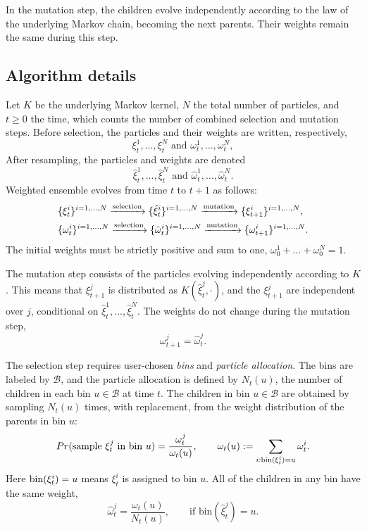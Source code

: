 \documentclass[11pt,letterpaper]{amsart}
\theoremstyle{plain}
\theoremstyle{definition}
\numberwithin{equation}{section}
\begin{document}
In the mutation step, the 
children evolve independently 
according to the law of the 
underlying Markov chain, becoming 
the next parents.
Their weights remain 
the same during this step.

\subsection{Algorithm details}

Let $K$ be the underlying Markov kernel, 
$N$ the total number of particles, 
and $t \ge 0$ the time, 
which counts the number of combined selection 
and mutation steps. Before selection, the particles 
and their weights are written, respectively,
$$\xi_t^1,\ldots,\xi_t^N \text{ and } 
\omega_t^1,\ldots,\omega_t^N,$$
After resampling, the particles 
and weights are denoted
$$\hat\xi_t^1,\ldots,\hat\xi_t^N\text{ and } 
\hat\omega_t^1,\ldots,\hat\omega_t^N.$$
Weighted ensemble evolves from 
time $t$ to $t+1$ as follows:
\begin{align*}
&\{\xi_t^i\}^{i=1,\ldots,N}
\xrightarrow{\textup{selection}} 
\{{\hat \xi}_t^i\}^{i=1,\ldots,N}
\xrightarrow{\textup{mutation}} 
\{{\xi}_{t+1}^i\}^{i=1,\ldots,N},\\
&\{\omega_t^i\}^{i=1,\ldots,N}
\xrightarrow{\textup{selection}} 
\{{\hat \omega}_t^i\}^{i=1,\ldots,{N}}
\xrightarrow{\textup{mutation}} 
\{{\omega}_{t+1}^i\}^{i=1,\ldots,N}.
\end{align*}
The initial weights must be strictly positive and sum to one, 
$\omega_0^1+\ldots+\omega_0^N = 1$.

The mutation step consists 
of the particles evolving independently
according to  
$K$.
This means that $\xi_{t+1}^j$ is 
distributed as $K({\hat \xi}_t^j,\cdot)$, 
and the $\xi_{t+1}^j$ are independent over 
$j$, conditional on $\hat{\xi}_t^1,\ldots,\hat{\xi}_t^N$.
The 
weights do not change during the 
mutation step, 
$${\omega}_{t+1}^{j} = \hat{\omega}_{t}^j.$$

The selection step requires user-chosen 
{\em bins} and {\em particle 
allocation}. 
The bins are labeled by ${\mathcal B}$, 
and the particle allocation is defined 
by $N_t(u)$, the number of children in each bin $u \in {\mathcal B}$ at time $t$. 
The children in bin $u \in {\mathcal B}$ 
are obtained by sampling $N_t(u)$ 
times, with replacement, from the 
weight distribution of the parents in bin $u$:
$$Pr(\textup{sample }\xi_t^j\text{ in bin }u) = \frac{\omega_t^j}{\omega_t(u)}, \qquad \omega_t(u) := \sum_{i:\textup{bin}(\xi_t^i) = u}\omega_t^i.$$
Here $\textup{bin}(\xi_t^i) = u$ means $\xi_t^i$ is assigned to bin $u$.
All of the children in any bin have the same weight, 
$$\hat{\omega}_t^j = \frac{\omega_t(u)}{N_t(u)},\qquad \text{if bin}(\hat{\xi}_t^j) =u.$$
\end{document}
